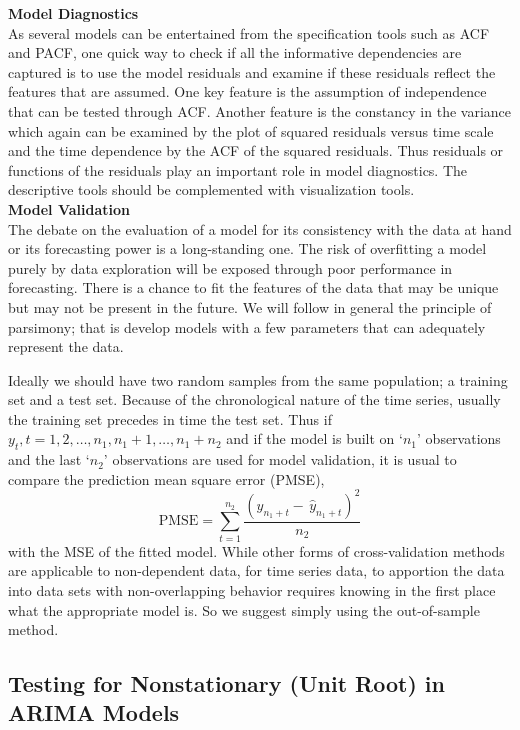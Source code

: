 \noindent\textbf{Model Diagnostics} \\


As several models can be entertained from the specification tools such as ACF and PACF, one quick way to check if all the informative dependencies are captured is to use the model residuals and examine if these residuals reflect the features that are assumed. One key feature is the assumption of independence that can be tested through ACF. Another feature is the constancy in the variance which again can be examined by the plot of squared residuals versus time scale and the time dependence by the ACF of the squared residuals. Thus residuals or functions of the residuals play an important role in model diagnostics. The descriptive tools should be complemented with visualization tools. \\


\noindent \textbf{Model Validation} \\


The debate on the evaluation of a model for its consistency with the data at hand or its forecasting power is a long-standing one. The risk of overfitting a model purely by data exploration will be exposed through poor performance in forecasting. There is a chance to fit the features of the data that may be unique but may not be present in the future. We will follow in general the principle of parsimony; that is develop models with a few parameters that can adequately represent the data. 


Ideally we should have two random samples from the same population; a training set and a test set. Because of the chronological nature of the time series, usually the training set precedes in time the test set. Thus if $y_t, t=1,2,\ldots,n_1,n_1+1,\ldots,n_1+n_2$ and if the model is built on `$n_1$' observations and the last `$n_2$' observations are used for model validation, it is usual to compare the prediction mean square error (PMSE),
	\begin{equation}\label{eqn:pmse}
	\text{PMSE} = \sum_{t=1}^{n_2} \frac{(y_{n_1+t} - \,\hat{y}_{n_1+t})^2}{n_2}
	\end{equation}
with the MSE of the fitted model. While other forms of cross-validation methods are applicable to non-dependent data, for time series data, to apportion the data into data sets with non-overlapping behavior requires knowing in the first place what the appropriate model is. So we suggest simply using the out-of-sample method.


\subsection{Testing for Nonstationary (Unit Root) in ARIMA Models} \hfill


